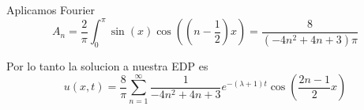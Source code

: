\documentclass[../main.tex]{subfiles}
\begin{document}
\begin{solution}
  Aplicamos Fourier
  \begin{equation*}
    A_{n} = \frac{2}{\pi} \int_{0}^{\pi} \sin(x) \cos((n - \frac12)x) = \frac{8}{(-4n^{2} + 4n + 3) \pi}
  \end{equation*}

  Por lo tanto la solucion a nuestra EDP es
  \begin{equation*}
    u(x, t) = \frac{8}{\pi} \sum_{n = 1}^{\infty} \frac{1}{-4n^{2} + 4n + 3} e^{-(\lambda + 1)t} \cos(\frac{2n - 1}{2}x)
  \end{equation*}
\end{solution}
\end{document}
